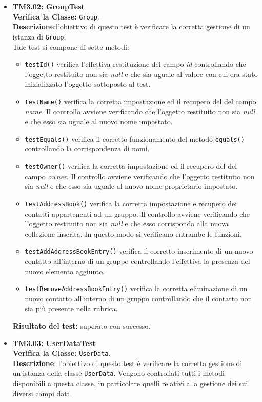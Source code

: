 \begin{itemize}
\item \textbf{TM3.02: GroupTest}\\
\textbf{Verifica la Classe:} \texttt{Group}.\\
\textbf{Descrizione}:l'obiettivo di questo test è verificare la corretta gestione di un istanza di \texttt{Group}.\\
Tale test si compone di sette metodi:
\begin{itemize}
\item \texttt{testId()} verifica l'effettiva restituzione del campo \textit{id} controllando che l'oggetto restituito non sia \textit{null} e che sia uguale al valore con cui era stato inizializzato l'oggetto sottoposto al test.
\item \texttt{testName()}
verifica la corretta impostazione ed il recupero del del campo \textit{name}. Il controllo avviene verificando che l'oggetto restituito non sia \textit{null} e che esso sia uguale al nuovo nome impostato. 
\item \texttt{testEquals()} 
verifica il corretto funzionamento del metodo \texttt{equals()} controllando la corrispondenza di nomi. 
\item \texttt{testOwner()} verifica la corretta impostazione ed il recupero del del campo \textit{owner}. Il controllo avviene verificando che l'oggetto restituito non sia \textit{null} e che esso sia uguale al nuovo nome proprietario impostato. 
\item \texttt{testAddressBook()} verifica la corretta impostazione e recupero dei contatti appartenenti ad un gruppo.
Il controllo avviene verificando che l'oggetto restituito non sia \textit{null} e che esso corrisponda alla nuova collezione inserita.
In questo modo si verificano entrambe le funzioni.
\item \texttt{testAddAddressBookEntry()} verifica il corretto inserimento di un nuovo contatto all'interno di un gruppo controllando l'effettiva la presenza del nuovo elemento aggiunto.
\item \texttt{testRemoveAddressBookEntry()}  
verifica la corretta eliminazione di un nuovo contatto all'interno di un gruppo controllando che il contatto non sia più presente nella rubrica.

\end{itemize}
\textbf{Risultato del test:} superato con successo.

\item \textbf{TM3.03: UserDataTest}\\
\textbf{Verifica la Classe:} \texttt{UserData}.\\
\textbf{Descrizione}: l'obiettivo di questo test è verificare la corretta gestione di un'istanza della classe \texttt{UserData}. Vengono controllati tutti i metodi disponibili a questa classe, in particolare quelli relativi alla gestione dei sui diversi campi dati.


\end{itemize}
